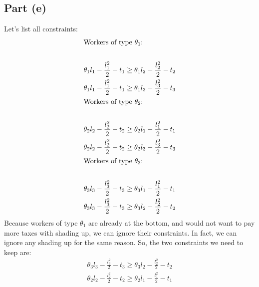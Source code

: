 \documentclass[10pt,a4paper]{article}
\begin{document}
  \subsection*{Part (e)}
    Let's list all constraints:
    \begin{gather*}
      \shortintertext{Workers of type $\theta_1$:} \\
      \theta_1l_1 - \frac{l_1^2}{2} - t_1 \geq \theta_1l_2 - \frac{l_2^2}{2} - t_2 \\
      \theta_1l_1 - \frac{l_1^2}{2} - t_1 \geq \theta_1l_3 - \frac{l_3^2}{2} - t_3 \\
      \shortintertext{Workers of type $\theta_2$:} \\
      \theta_2l_2 - \frac{l_2^2}{2} - t_2 \geq \theta_2l_1 - \frac{l_1^2}{2} - t_1 \\
      \theta_2l_2 - \frac{l_2^2}{2} - t_2 \geq \theta_2l_3 - \frac{l_3^2}{2} - t_3 \\
      \shortintertext{Workers of type $\theta_3$:} \\
      \theta_3l_3 - \frac{l_3^2}{2} - t_3 \geq \theta_3l_1 - \frac{l_1^2}{2} - t_1 \\
      \theta_3l_3 - \frac{l_3^2}{2} - t_3 \geq \theta_3l_2 - \frac{l_2^2}{2} - t_2 \\
    \end{gather*}
    Because workers of type $\theta_1$ are already at the bottom, and would not want to pay more taxes with shading up, we can ignore their constraints. In fact, we can ignore any shading up for the same reason. So, the two constraints we need to keep are:
    \begin{gather*}
      \theta_3l_3 - \frac{l_3^2}{2} - t_3 \geq \theta_3l_2 - \frac{l_2^2}{2} - t_2 \\
      \theta_2l_2 - \frac{l_2^2}{2} - t_2 \geq \theta_2l_1 - \frac{l_1^2}{2} - t_1 \\
    \end{gather*}
\end{document}
